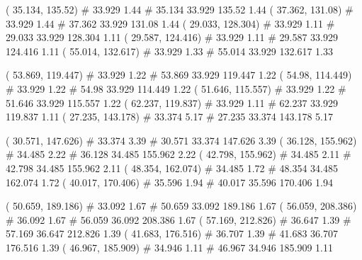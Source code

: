 \documentclass[a4paper,openbib,10pt]{article}
\newenvironment{treegraph}{\begin{graph}}{\end{graph}}
\begin{document}
\begin{treegraph}
  ( 35.134, 135.52) #     33.929    1.44
   #    35.134    33.929    135.52    1.44
  ( 37.362, 131.08) #     33.929    1.44
   #    37.362    33.929    131.08    1.44
  ( 29.033, 128.304) #     33.929    1.11
   #    29.033    33.929    128.304    1.11
  ( 29.587, 124.416) #     33.929    1.11
   #    29.587    33.929    124.416    1.11
  ( 55.014, 132.617) #     33.929    1.33
   #    55.014    33.929    132.617    1.33

  ( 53.869, 119.447) #     33.929    1.22
   #    53.869    33.929    119.447    1.22
  ( 54.98, 114.449) #     33.929    1.22
   #    54.98    33.929    114.449    1.22
  ( 51.646, 115.557) #     33.929    1.22
   #    51.646    33.929    115.557    1.22
  ( 62.237, 119.837) #     33.929    1.11
   #    62.237    33.929    119.837    1.11
  ( 27.235, 143.178) #     33.374    5.17
   #    27.235    33.374    143.178    5.17

  ( 30.571, 147.626) #     33.374    3.39
   #    30.571    33.374    147.626    3.39
  ( 36.128, 155.962) #     34.485    2.22
   #    36.128    34.485    155.962    2.22
  ( 42.798, 155.962) #     34.485    2.11
   #    42.798    34.485    155.962    2.11
  ( 48.354, 162.074) #     34.485    1.72
   #    48.354    34.485    162.074    1.72
  ( 40.017, 170.406) #     35.596    1.94
   #    40.017    35.596    170.406    1.94

  ( 50.659, 189.186) #     33.092    1.67
   #    50.659    33.092    189.186    1.67
  ( 56.059, 208.386) #     36.092    1.67
   #    56.059    36.092    208.386    1.67
  ( 57.169, 212.826) #     36.647    1.39
   #    57.169    36.647    212.826    1.39
  ( 41.683, 176.516) #     36.707    1.39
   #    41.683    36.707    176.516    1.39
  ( 46.967, 185.909) #     34.946    1.11
   #    46.967    34.946    185.909    1.11


\end{treegraph}
\end{document}
